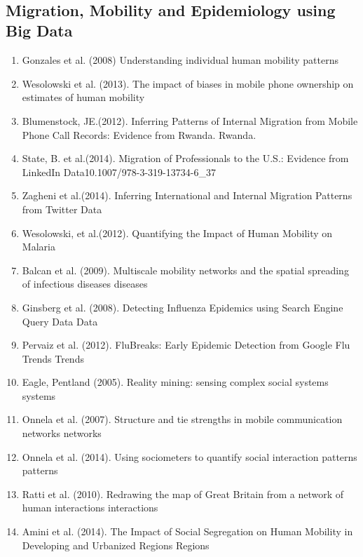 \\  \subsection{Migration, Mobility and Epidemiology using Big Data}  \begin{enumerate} 
\item Gonzales et al. (2008)  Understanding individual human mobility patterns\cite{Gonz_lez_2008} 
\item Wesolowski et al. (2013).  The impact of biases in mobile phone ownership on estimates of human mobility\cite{Wesolowski_2013}  
\item  Blumenstock, JE.(2012).  Inferring Patterns of Internal Migration from Mobile Phone Call Records: Evidence from Rwanda\cite{Blumenstock_2012}. Rwanda.  
\item  State, B. et al.(2014).  Migration of Professionals to the U.S.: Evidence from LinkedIn Data10.1007/978-3-319-13734-6_37\cite{State_2014}  
\item  Zagheni et al.(2014).  Inferring International and Internal Migration Patterns from Twitter Data\cite{Zagheni:2014:III:2567948.2576930}  
\item  Wesolowski, et al.(2012).  Quantifying the Impact of Human Mobility on Malaria \cite{Wesolowski_2012} 
\item Balcan et al. (2009).  Multiscale mobility networks and the spatial spreading of infectious diseases\cite{Balcan_2009} diseases  
\item Ginsberg et al. (2008).  Detecting Influenza Epidemics using Search Engine Query Data\cite{Ginsberg_2008} Data  
\item Pervaiz et al. (2012).  FluBreaks: Early Epidemic Detection from Google Flu Trends\cite{Pervaiz_2012} Trends  \item Eagle, Pentland (2005).  Reality mining: sensing complex social systems\cite{Eagle_2005} systems  
\item Onnela et al. (2007).  Structure and tie strengths in mobile communication networks\cite{Onnela_2007} networks  
\item Onnela et al. (2014).  Using sociometers to quantify social interaction patterns\cite{Onnela_2014} patterns  
\item Ratti et al. (2010).  Redrawing the map of Great Britain from a network of human interactions\cite{Ratti_2010} interactions  \item Amini et al. (2014).  The Impact of Social Segregation on Human Mobility in Developing and Urbanized Regions\cite{Amini_2014} Regions  

\end{enumerate}
